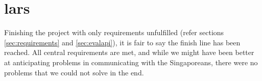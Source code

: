 \section{lars}
Finishing the project with only requirements unfulfilled (refer sections
\ref{sec:requirements} and \ref{sec:evalapi}), it is fair to say the finish line
has been reached. All central requirements are met, and while we might have been
better at anticipating problems in communicating with the Singaporeans, there
were no problems that we could not solve in the end.
